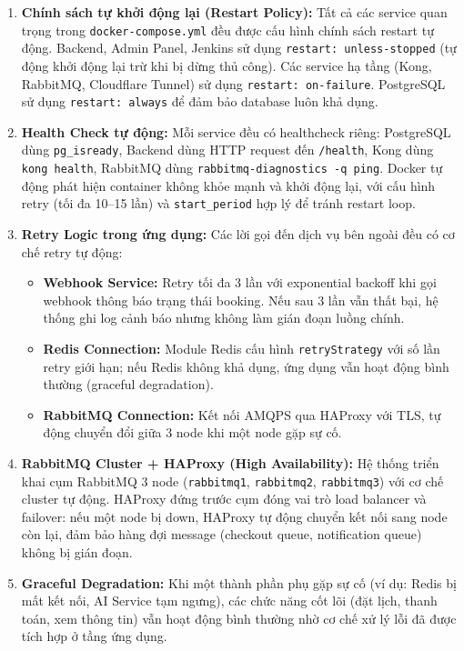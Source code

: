 \begin{enumerate}
    \item \textbf{Chính sách tự khởi động lại (Restart Policy):} Tất cả các service quan trọng trong \texttt{docker-compose.yml} đều được cấu hình chính sách restart tự động. Backend, Admin Panel, Jenkins sử dụng \texttt{restart: unless-stopped} (tự động khởi động lại trừ khi bị dừng thủ công). Các service hạ tầng (Kong, RabbitMQ, Cloudflare Tunnel) sử dụng \texttt{restart: on-failure}. PostgreSQL sử dụng \texttt{restart: always} để đảm bảo database luôn khả dụng.

    \item \textbf{Health Check tự động:} Mỗi service đều có healthcheck riêng: PostgreSQL dùng \texttt{pg\_isready}, Backend dùng HTTP request đến \texttt{/health}, Kong dùng \texttt{kong health}, RabbitMQ dùng \texttt{rabbitmq-diagnostics -q ping}. Docker tự động phát hiện container không khỏe mạnh và khởi động lại, với cấu hình retry (tối đa 10--15 lần) và \texttt{start\_period} hợp lý để tránh restart loop.

    \item \textbf{Retry Logic trong ứng dụng:} Các lời gọi đến dịch vụ bên ngoài đều có cơ chế retry tự động:
    \begin{itemize}
        \item \textbf{Webhook Service:} Retry tối đa 3 lần với exponential backoff khi gọi webhook thông báo trạng thái booking. Nếu sau 3 lần vẫn thất bại, hệ thống ghi log cảnh báo nhưng không làm gián đoạn luồng chính.
        \item \textbf{Redis Connection:} Module Redis cấu hình \texttt{retryStrategy} với số lần retry giới hạn; nếu Redis không khả dụng, ứng dụng vẫn hoạt động bình thường (graceful degradation).
        \item \textbf{RabbitMQ Connection:} Kết nối AMQPS qua HAProxy với TLS, tự động chuyển đổi giữa 3 node khi một node gặp sự cố.
    \end{itemize}

    \item \textbf{RabbitMQ Cluster + HAProxy (High Availability):} Hệ thống triển khai cụm RabbitMQ 3 node (\texttt{rabbitmq1}, \texttt{rabbitmq2}, \texttt{rabbitmq3}) với cơ chế cluster tự động. HAProxy đứng trước cụm đóng vai trò load balancer và failover: nếu một node bị down, HAProxy tự động chuyển kết nối sang node còn lại, đảm bảo hàng đợi message (checkout queue, notification queue) không bị gián đoạn.

    \item \textbf{Graceful Degradation:} Khi một thành phần phụ gặp sự cố (ví dụ: Redis bị mất kết nối, AI Service tạm ngưng), các chức năng cốt lõi (đặt lịch, thanh toán, xem thông tin) vẫn hoạt động bình thường nhờ cơ chế xử lý lỗi đã được tích hợp ở tầng ứng dụng.
\end{enumerate}


